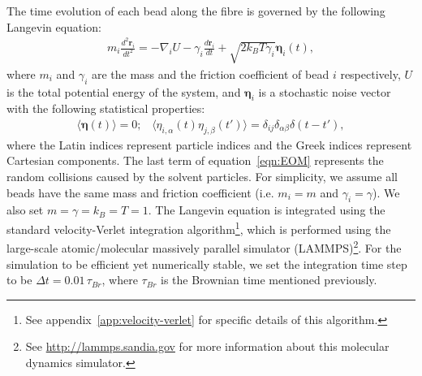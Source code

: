\documentclass[12pt]{article}
\begin{document}
The time evolution of each bead along the fibre is governed by the following Langevin equation:
\begin{eqnarray}
\label{eqn:EOM}
m_i\frac{d^2\bm{r}_i}{dt^2} = - \nabla_i U - \gamma_i \frac{d\bm{r}_i}{dt} + \sqrt{2k_BT\gamma_i}\bm{\eta}_i(t),
\end{eqnarray}
where $m_i$ and $\gamma_i$ are the mass and the friction coefficient of bead $i$ respectively, $U$ is the total potential energy of the system, and $\bm{\eta}_i$ is a stochastic noise vector with the following statistical properties:
\begin{eqnarray}
\langle\bm{\eta}(t)\rangle = 0;\;\;\; \langle\eta_{i,\alpha}(t)\eta_{j,\beta}(t')\rangle = \delta_{ij}\delta_{\alpha\beta}\delta(t-t'),
\end{eqnarray}
where the Latin indices represent particle indices and the Greek indices represent Cartesian components. The last term of equation~\ref{eqn:EOM} represents the random collisions caused by the solvent particles. For simplicity, we assume all beads have the same mass and friction coefficient (i.e. $m_i = m$ and $\gamma_i = \gamma $). We also set $m = \gamma = k_B = T = 1$. The Langevin equation is integrated using the standard velocity-Verlet integration algorithm\footnote{See appendix~\ref{app:velocity-verlet} for specific details of this algorithm.}, which is performed using the large-scale atomic/molecular massively parallel simulator (LAMMPS)\footnote{See \url{http://lammps.sandia.gov} for more information about this molecular dynamics simulator.}. For the simulation to be efficient yet numerically stable, we set the integration time step to be $\Delta t = 0.01\,\tau_{Br}$, where $\tau_{Br}$ is the Brownian time mentioned previously.
\end{document}

